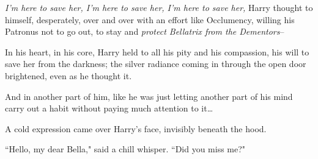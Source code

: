 \emph{I'm here to save her, I'm here to save her, I'm here to save her,} Harry thought to himself, desperately, over and over with an effort like Occlumency, willing his Patronus not to go out, to stay and \emph{protect Bellatrix from the Dementors}\---

In his heart, in his core, Harry held to all his pity and his compassion, his will to save her from the darkness; the silver radiance coming in through the open door brightened, even as he thought it.

And in another part of him, like he was just letting another part of his mind carry out a habit without paying much attention to it{\ldots}

A cold expression came over Harry's face, invisibly beneath the hood.

``Hello, my dear Bella," said a chill whisper. ``Did you miss me?"

